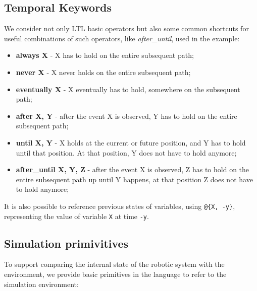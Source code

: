 \documentclass[runningheads]{llncs}
\begin{document}
\subsection{Temporal Keywords}

We consider not only LTL basic operators but also some common shortcuts for useful combinations of such operators, like \textit{after\_until}, used in the example:

\begin{itemize}
\item {\bfseries always X} - X has to hold on the entire subsequent path;
\item {\bfseries never X} - X never holds on the entire subsequent path;
\item {\bfseries eventually X} - X eventually has to hold, somewhere on the subsequent path;
\item {\bfseries after X, Y} - after the event X is observed, Y has to hold on the entire subsequent path;
\item {\bfseries until X, Y} - X holds at the current or future position, and Y has to hold until that position. At that position, Y does not have to hold anymore;
\item {\bfseries after\_until X, Y, Z} - after the event X is observed, Z has to hold on the entire subsequent path up until Y happens, at that position Z does not have to hold anymore;
\end{itemize}

\noindent It is also possible to reference previous states of variables, using \lstinline|@{X, -y}|, representing the value of variable \lstinline|X| at time \lstinline|-y|.

\subsection{Simulation primivitives}

To support comparing the internal state of the robotic system with the environment, we provide basic primitives in the language to refer to the simulation environment:
\end{document}
